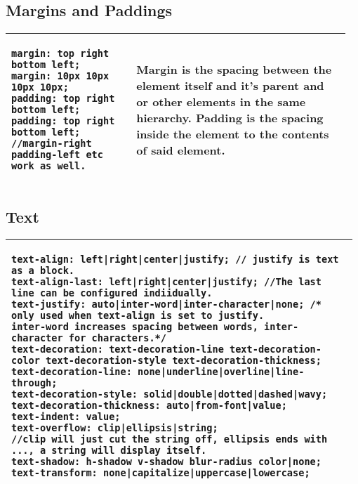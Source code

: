 \documentclass[main.tex,fontsize=8pt,paper=a4,paper=portrait,DIV=calc,]{scrartcl}
\begin{document}
\begin{table}[h!]
\subsection{Margins and Paddings}
\begin{tabular}{|m{0.355\linewidth}|m{0.6\linewidth}|}
\hline
\begin{lstlisting}
margin: top right bottom left;
margin: 10px 10px 10px 10px;
padding: top right bottom left;
padding: top right bottom left;
//margin-right padding-left etc work as well.
\end{lstlisting}
&
Margin is the spacing between the element itself and it's parent and or other elements in the same hierarchy.\newline
Padding is the spacing inside the element to the contents of said element.
\\

\hline
\end{tabular}
\end{table}
\pagebreak
\begin{table}[h!]
\subsection{Text}
\begin{tabular}{|m{0.975\linewidth}|}
\hline
\begin{lstlisting}
text-align: left|right|center|justify; // justify is text as a block.
text-align-last: left|right|center|justify; //The last line can be configured indiidually.
text-justify: auto|inter-word|inter-character|none; /* only used when text-align is set to justify.
inter-word increases spacing between words, inter-character for characters.*/
text-decoration: text-decoration-line text-decoration-color text-decoration-style text-decoration-thickness;
text-decoration-line: none|underline|overline|line-through;
text-decoration-style: solid|double|dotted|dashed|wavy;
text-decoration-thickness: auto|from-font|value;
text-indent: value;
text-overflow: clip|ellipsis|string; 
//clip will just cut the string off, ellipsis ends with ..., a string will display itself.
text-shadow: h-shadow v-shadow blur-radius color|none;
text-transform: none|capitalize|uppercase|lowercase;
\end{lstlisting}
\\
\hline
\end{tabular}
\end{table}
\pagebreak
\end{document}
